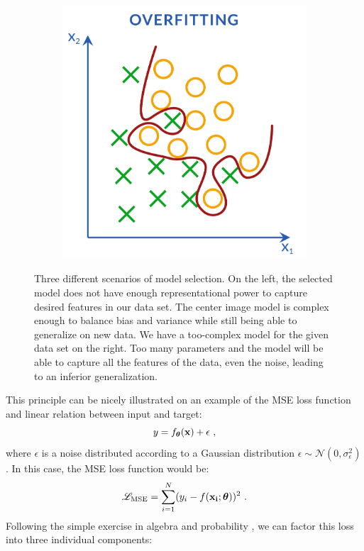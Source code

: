 \begin{figure}[h]
\begin{subfigure}{0.33\textwidth}
	\end{subfigure}%
	\begin{subfigure}{0.33\textwidth}
		\centering
		\includegraphics[width=\columnwidth]{figures/introduction/overfitting.pdf}
	\end{subfigure}
	\caption{Three different scenarios of model selection. On the left, the selected model does not have enough representational power to capture desired features in our data set. The center image model is complex enough to balance bias and variance while still being able to generalize on new data. We have a too-complex model for the given data set on the right. Too many parameters and the model will be able to capture all the features of the data, even the noise, leading to an inferior generalization.}
	\label{gr:fittingScenarios}
\end{figure}
\par
This principle can be nicely illustrated on an example of the MSE loss function and linear relation between input and target:
\begin{equation}
	y = f_{\boldsymbol{\theta}}(\vb{x}) + \epsilon \ ,
\end{equation}
where $\epsilon$ is a noise distributed according to a Gaussian distribution $\epsilon \sim \mathcal{N}(0, \sigma_\epsilon^2)$. In this case, the MSE loss function would be:
\begin{equation}
	\mathcal{L}_{\text{MSE}} = \sum_{i=1}^N (y_i - f(\vb{x_i}; \boldsymbol{\theta}))^2 \ .
\end{equation}
Following the simple exercise in algebra and probability \cite{MLintro}, we can factor this loss into three individual components:

